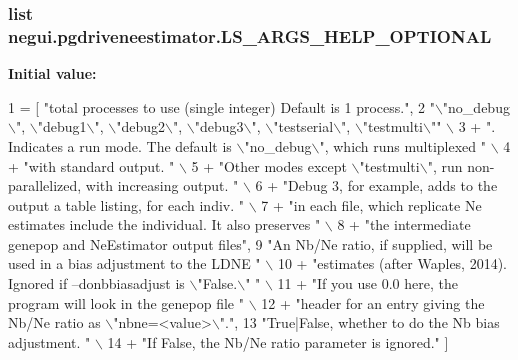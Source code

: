 \subsubsection[{\texorpdfstring{L\+S\+\_\+\+A\+R\+G\+S\+\_\+\+H\+E\+L\+P\+\_\+\+O\+P\+T\+I\+O\+N\+AL}{LS_ARGS_HELP_OPTIONAL}}]{\setlength{\rightskip}{0pt plus 5cm}list negui.\+pgdriveneestimator.\+L\+S\+\_\+\+A\+R\+G\+S\+\_\+\+H\+E\+L\+P\+\_\+\+O\+P\+T\+I\+O\+N\+AL}\hypertarget{namespacenegui_1_1pgdriveneestimator_ad14f2792e801804d0cd77aa3f72631e4}{}\label{namespacenegui_1_1pgdriveneestimator_ad14f2792e801804d0cd77aa3f72631e4}
{\bfseries Initial value\+:}
\begin{DoxyCode}
1 = [  \textcolor{stringliteral}{"total processes to use (single integer) Default is 1 process."},
2                 \textcolor{stringliteral}{"\(\backslash\)"no\_debug\(\backslash\)", \(\backslash\)"debug1\(\backslash\)", \(\backslash\)"debug2\(\backslash\)", \(\backslash\)"debug3\(\backslash\)", \(\backslash\)"testserial\(\backslash\)", \(\backslash\)"testmulti\(\backslash\)""} \(\backslash\)
3                 + \textcolor{stringliteral}{".  Indicates a run mode. The default is \(\backslash\)"no\_debug\(\backslash\)", which runs multiplexed "} \(\backslash\)
4                 + \textcolor{stringliteral}{"with standard output.  "} \(\backslash\)
5                 + \textcolor{stringliteral}{"Other modes except \(\backslash\)"testmulti\(\backslash\)", run non-parallelized, with increasing output.  "} \(\backslash\)
6                 + \textcolor{stringliteral}{"Debug 3, for example, adds to the output a table listing, for each indiv. "} \(\backslash\)
7                 + \textcolor{stringliteral}{"in each file, which replicate Ne estimates include the individual.  It also preserves "} 
      \(\backslash\)
8                 + \textcolor{stringliteral}{"the intermediate genepop and NeEstimator output files"},
9                 \textcolor{stringliteral}{"An Nb/Ne ratio, if supplied, will be used in a bias adjustment to the LDNE "} \(\backslash\)
10                 + \textcolor{stringliteral}{"estimates (after Waples, 2014).  Ignored if --donbbiasadjust is \(\backslash\)"False.\(\backslash\)"  "} \(\backslash\)
11                     + \textcolor{stringliteral}{"If you use 0.0 here, the program will look in the genepop file "} \(\backslash\)
12                     + \textcolor{stringliteral}{"header for an entry giving the Nb/Ne ratio as \(\backslash\)"nbne=<value>\(\backslash\)"."}, 
13                 \textcolor{stringliteral}{"True|False, whether to do the Nb bias adjustment. "} \(\backslash\)
14                 + \textcolor{stringliteral}{"If False, the Nb/Ne ratio parameter is ignored."} ]
\end{DoxyCode}


